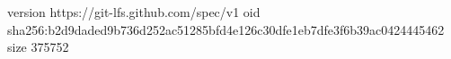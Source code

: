 version https://git-lfs.github.com/spec/v1
oid sha256:b2d9daded9b736d252ac51285bfd4e126c30dfe1eb7dfe3f6b39ac0424445462
size 375752
